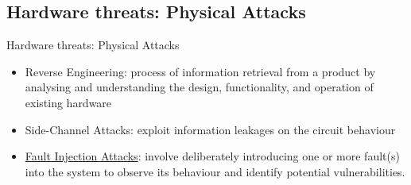 \subsection{Hardware threats: Physical Attacks}
\begin{frame}{Hardware threats: Physical Attacks}
    \begin{block}{}
        \begin{itemize}
            [square]
            \justifying
            \item<1> Reverse Engineering: process of information retrieval from a product by analysing and understanding the design, functionality, and operation of existing hardware
            \item<2> Side-Channel Attacks: exploit information leakages on the circuit behaviour
            \item<3> \underline{Fault Injection Attacks}: involve deliberately introducing one or more fault(s) into the system to observe its behaviour and identify potential vulnerabilities.
        \end{itemize}
    \end{block}


\end{frame}
